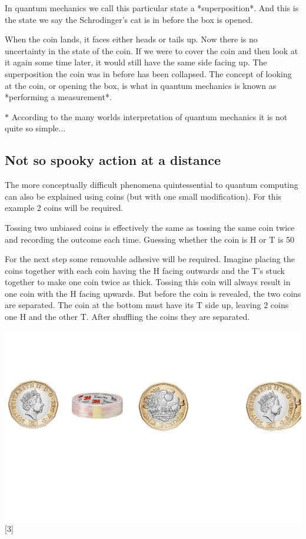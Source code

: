 \documentclass{book}
\begin{document}
In quantum mechanics we call this particular state a *superposition*. And this is the state we say the Schrodinger's cat is in before the box is opened. 

When the coin lands, it faces either heads or tails up. Now there is no uncertainty in the state of the coin. If we were to cover the coin and then look at it again some time later, it would still have the same side facing up. The superposition the coin was in before has been collapsed. The concept of looking at the coin, or opening the box, is what in quantum mechanics is known as *performing a measurement*.

$*$ According to the many worlds interpretation of quantum mechanics it is not quite so simple...

\subsection{ Not so spooky action at a distance}

The more conceptually difficult phenomena quintessential to quantum computing can also be explained using coins (but with one small modification). For this example 2 coins will be required. 

Tossing two unbiased coins is effectively the same as tossing the same coin twice and recording the outcome each time. Guessing whether the coin is H or T is 50%

For the next step some removable adhesive will be required. Imagine placing the coins together with each coin having the H facing outwards and the T's stuck together to make one coin twice as thick. Tossing this coin will always result in one coin with the H facing upwards. But before the coin is revealed, the two coins are separated. The coin at the bottom must have its T side up, leaving 2 coins one H and the other T. After shuffling the coins they are separated. 

\includegraphics{images/Entanglement.png}
[3]
\end{document}

